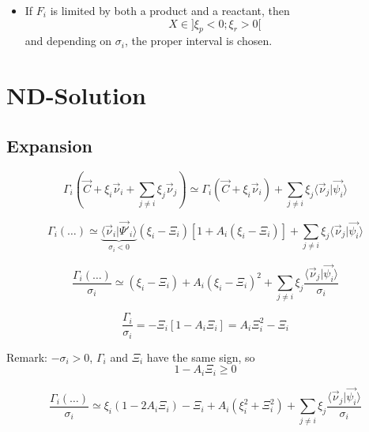 \documentclass[aps,12pt]{revtex4}
\begin{document}
\begin{itemize}
\begin{itemize}
	\item If $F_i$ is limited by both a product and a reactant, then $$X\in\rbrack \xi_p < 0 ; \xi_r > 0 \lbrack$$
	and depending on $\sigma_i$, the proper interval is chosen.
	\end{itemize}
	
\end{itemize}

\section{ND-Solution} 	

\subsection{Expansion}

\begin{equation}
	\Gamma_i\left(\vec{C} + \xi_i \vec{\nu}_i + \sum_{j\not=i} \xi_j \vec{\nu}_j \right) 
	\simeq 
	\Gamma_i(\vec{C} + \xi_i \vec{\nu}_i) + \sum_{j\not=i} \xi_j \langle \vec{\nu}_j \vert \vec{\psi_i} \rangle
\end{equation}

\begin{equation}
	\Gamma_i(\ldots) \simeq \underbrace{\langle \vec{\nu}_i \vert \vec{\Psi'}_i\rangle}_{\sigma_i<0} \left(\xi_i - \Xi_i\right)\left[ 1 + A_i \left(\xi_i - \Xi_i\right)\right] + \sum_{j\not=i} \xi_j \langle \vec{\nu}_j \vert \vec{\psi_i} \rangle
\end{equation}

\begin{equation}
	\dfrac{\Gamma_i(\ldots)}{\sigma_i} \simeq (\xi_i - \Xi_i) + A_i (\xi_i - \Xi_i)^2 + \sum_{j\not=i} \xi_j \dfrac{\langle \vec{\nu}_j \vert \vec{\psi_i} \rangle}{\sigma_i}
\end{equation}

\begin{equation}
	\dfrac{\Gamma_i}{\sigma_i} = -\Xi_i \left[ 1 - A_i \Xi_i \right] = A_i\Xi_i^2 - \Xi_i
\end{equation}

Remark: $-\sigma_i>0$, $\Gamma_i$ and $\Xi_i$ have the same sign, so
\begin{equation}
	1-A_i\Xi_i \geq 0
\end{equation}

\begin{equation}
\dfrac{\Gamma_i(\ldots)}{\sigma_i}   \simeq  \xi_i (1-2A_i\Xi_i) - \Xi_i + A_i (\xi_i^2 + \Xi_i^2) + \sum_{j\not=i} \xi_j \dfrac{\langle \vec{\nu}_j \vert \vec{\psi_i} \rangle}{\sigma_i}
\end{equation}
\end{document}
